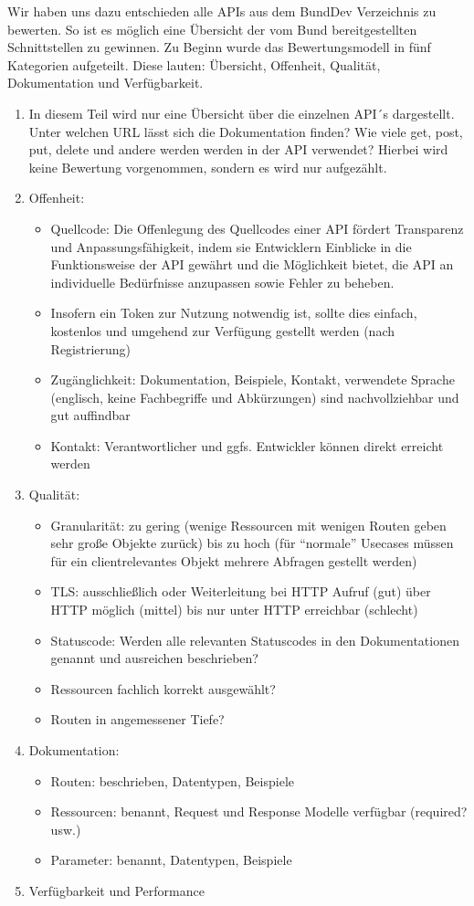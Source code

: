 \documentclass[notitlepage, hidelinks]{article}
\begin{document}
Wir haben uns dazu entschieden alle APIs aus dem BundDev Verzeichnis zu bewerten. So ist es möglich eine Übersicht der vom Bund bereitgestellten Schnittstellen zu gewinnen. Zu Beginn wurde das Bewertungsmodell in fünf Kategorien aufgeteilt. Diese lauten: Übersicht, Offenheit, Qualität, Dokumentation und Verfügbarkeit.

\begin{enumerate}
\item In diesem Teil wird nur eine Übersicht über die einzelnen API´s dargestellt. Unter welchen URL lässt sich die Dokumentation finden? Wie viele get, post, put, delete und andere werden werden in der API verwendet? Hierbei wird keine Bewertung vorgenommen, sondern es wird nur aufgezählt.
\item Offenheit: 
\begin{itemize}
\item Quellcode: Die Offenlegung des Quellcodes einer API fördert Transparenz und Anpassungsfähigkeit, indem sie Entwicklern Einblicke in die Funktionsweise der API gewährt und die Möglichkeit bietet, die API an individuelle Bedürfnisse anzupassen sowie Fehler zu beheben.
\item Insofern ein Token zur Nutzung notwendig ist, sollte dies einfach, kostenlos und umgehend zur Verfügung gestellt werden (nach Registrierung)
\item Zugänglichkeit: Dokumentation, Beispiele, Kontakt, verwendete Sprache (englisch, keine Fachbegriffe und Abkürzungen) sind nachvollziehbar und gut auffindbar
\item Kontakt: Verantwortlicher und ggfs. Entwickler können direkt erreicht werden
\end{itemize}
\item Qualität: 
\begin{itemize}
\item Granularität: zu gering (wenige Ressourcen mit wenigen Routen geben sehr große Objekte zurück) bis zu hoch (für ``normale'' Usecases müssen für ein clientrelevantes Objekt mehrere Abfragen gestellt werden)
\item TLS: ausschließlich oder Weiterleitung bei HTTP Aufruf (gut) über HTTP möglich (mittel) bis nur unter HTTP erreichbar (schlecht)
\item Statuscode: Werden alle relevanten Statuscodes in den Dokumentationen genannt und ausreichen beschrieben?
\item Ressourcen fachlich korrekt ausgewählt?
\item Routen in angemessener Tiefe?
\end{itemize}
\item Dokumentation:
\begin{itemize}
\item Routen: beschrieben, Datentypen, Beispiele
\item Ressourcen: benannt, Request und Response Modelle verfügbar (required? usw.)
\item Parameter: benannt, Datentypen, Beispiele
\end{itemize}
\item Verfügbarkeit und Performance
\end{enumerate}
\end{document}
